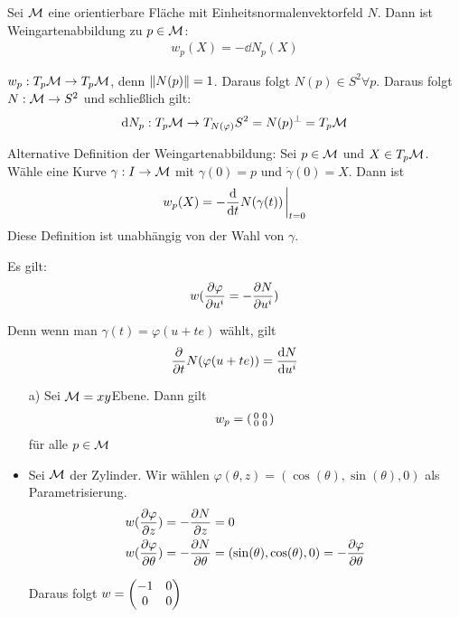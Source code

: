\begin{defs}[Weingartenabbildung]
    Sei $\mathcal{M}$ eine orientierbare Fläche mit Einheitsnormalenvektorfeld $N$.
    Dann ist Weingartenabbildung zu $p \in \mathcal{M}$:
    \begin{align}
        w_p (X) = - \dd N_p(X)
    \end{align}
\end{defs}

\begin{bem}
    $w_p: T_p\mathcal{M} \to T_p\mathcal{M}$, denn $\norm{N(p)}=1$. Daraus folgt $N(p)\in S^2 \forall p$.
    Daraus folgt $N: \mathcal{M} \to S^2$ und schließlich gilt:
    \begin{align*}
        \dd N_p : T_p\mathcal{M} \to T_{N(\varphi)} S^2 = N(p)^\perp = T_p\mathcal{M} 
    \end{align*}
\end{bem}

\begin{bem}
    Alternative Definition der Weingartenabbildung:
    Sei $p \in \mathcal{M}$ und $X\in T_p\mathcal{M}$.
    Wähle eine Kurve $\gamma : I \to \mathcal{M}$ mit $\gamma (0) = p$ und $\dot{\gamma}(0) = X$.
    Dann ist 
    \begin{align}
        w_p (X) = - \dv{t} N(\gamma (t))\eval_{t=0}
    \end{align}
    Diese Definition ist unabhängig von der Wahl von $\gamma$.
\end{bem}


\begin{bem}
    Es gilt:
    \begin{align*}
        w (\pdv{\varphi}{u^i} = - \pdv{N}{u^i})
    \end{align*}

    Denn wenn man $\gamma(t) = \varphi (u+te) $ wählt, gilt
    \begin{align*}
        \pdv{t} N(\varphi (u + t e)) = \dv{N}{u^i}
    \end{align*}
\end{bem}

\begin{bsp}
    \begin{itemize}
        \item[a)] Sei $\mathcal{M} = xy$Ebene. Dann gilt
        \begin{align*}
            w_p =\smqty(\zmat{2}{2}) 
        \end{align*}
        für alle $p \in \mathcal{M}$
    \item Sei $\mathcal{M}$ der Zylinder.
        Wir wählen $\varphi (\theta , z) = (\cos (\theta) , \sin (\theta) , 0)$ als Parametrisierung.
        \begin{align*}
            & w(\pdv{\varphi}{z}) = - \pdv{N}{z} = 0 \\
            & w ( \pdv{\varphi}{\theta}) = - \pdv{N}{\theta} = ( \sin ( \theta) , \cos ( \theta) , 0 ) = - \pdv{\varphi}{\theta}
        \end{align*}

        Daraus folgt $w =\mqty(-1 & 0 \\ 0 & 0) $
    \end{itemize}    
\end{bsp}


